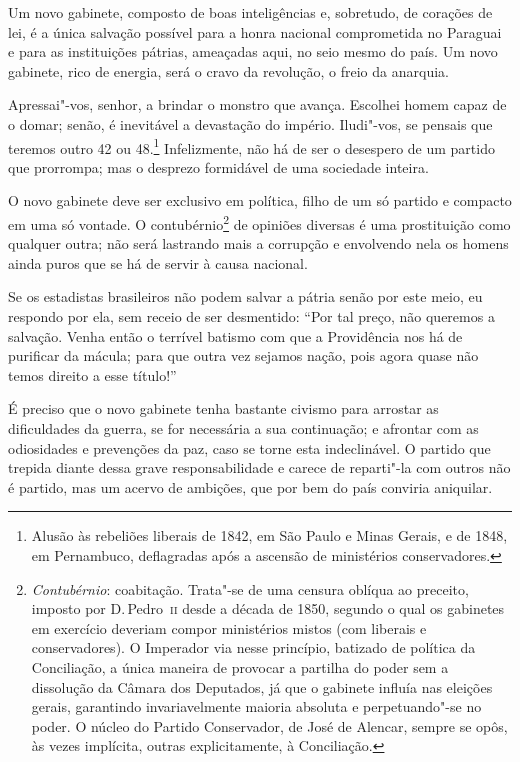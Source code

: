 \begin{linenumbers}
 Um novo gabinete, composto de boas inteligências e, sobretudo, de
corações de lei, é a única salvação possível para a honra nacional
comprometida no Paraguai e para as instituições pátrias, ameaçadas
aqui, no seio mesmo do país. Um novo gabinete, rico de energia, será o
cravo da revolução, o freio da anarquia.

 Apressai"-vos, senhor, a brindar o monstro que avança. Escolhei homem
capaz de o domar; senão, é inevitável a devastação do império.
Iludi"-vos, se pensais que teremos outro 42 ou
48.\footnote{ Alusão às rebeliões liberais de 1842, em São Paulo 
e Minas Gerais, e de 1848, em Pernambuco, deflagradas após a ascensão de ministérios conservadores.}
 Infelizmente, não há de ser o desespero de um partido que prorrompa;
mas o desprezo formidável de uma sociedade inteira.

 O novo gabinete deve ser exclusivo em política, filho de um só partido
e compacto em uma só vontade. O
contubérnio\footnote{ \textit{Contubérnio}: coabitação. Trata"-se de uma censura oblíqua ao preceito,
imposto por D.\,Pedro~\textsc{ii} desde a década de 1850, segundo o qual os
gabinetes em exercício deveriam compor ministérios mistos (com liberais
e conservadores). O Imperador via nesse princípio, batizado de política
da Conciliação, a única maneira de provocar a partilha do poder sem a
dissolução da Câmara dos Deputados, já que o gabinete influía nas
eleições gerais, garantindo invariavelmente maioria absoluta e
perpetuando"-se no poder. O núcleo do Partido Conservador, de José de
Alencar, sempre se opôs, às vezes implícita, outras explicitamente, à
Conciliação.}
 de opiniões diversas é uma prostituição como qualquer outra; não será
lastrando mais a corrupção e envolvendo nela os homens ainda puros que
se há de servir à causa nacional. 

 Se os estadistas brasileiros não podem salvar a pátria senão por este
meio, eu respondo por ela, sem receio de ser desmentido: ``Por tal
preço, não queremos a salvação. Venha então o terrível batismo com que
a Providência nos há de purificar da mácula; para que outra vez sejamos
nação, pois agora quase não temos direito a esse título!''

 É preciso que o novo gabinete tenha bastante civismo para arrostar as
dificuldades da guerra, se for necessária a sua continuação; e afrontar
com as odiosidades e prevenções da paz, caso se torne esta
indeclinável. O partido que trepida diante dessa grave responsabilidade
e carece de reparti"-la com outros não é partido, mas um acervo de
ambições, que por bem do país conviria aniquilar.


\end{linenumbers}

